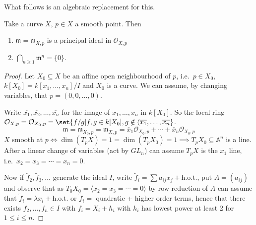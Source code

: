 \documentclass{article}
\newcommand{\A}{\mathbb{A}}
\begin{document}
What follows is an algebraic replacement for this.
\begin{thm}
    Take a curve $X$, $p \in X$ a smooth point. Then
    \begin{enumerate}[label=(\roman*)]
        \item $\mathfrak{m} = \mathfrak{m}_{X, p}$ is a principal ideal in $\mathcal{O}_{X, p}$
        \item $\bigcap_{n \geq 1} \mathfrak{m}^n = \{0\}$.
    \end{enumerate}
\end{thm}
\begin{proof}
    Let $X_0 \subseteq X$ be an affine open neighbourhood of $p$, i.e.\ $p \in X_0$, $k[X_0] = k[x_1, \dotsc, x_n] / I$ and $X_0$ is a curve.
    We can assume, by changing variables, that $p = (0, 0, \dotsc, 0)$.

    Write $\overline{x_1}, \overline{x_2}, \dotsc, \overline{x_n}$ for the image of $x_1, \dotsc, x_n$ in $k[X_0]$.
    So the local ring $\mathcal{O}_{X, p} = \mathcal{O}_{X_0, p} = \set{f / g | f, g \in k[X_0], g \notin \langle \overline{x_1}, \dotsc, \overline{x_n}}$.
    \begin{equation*}
        \mathfrak{m} = \mathfrak{m}_{X_0, p} = \mathfrak{m}_{X, p} = \overline{x}_1 \mathcal{O}_{X_0, p} + \dotsb + \overline{x}_n \mathcal{O}_{X_0, p}
    \end{equation*}
    $X$ smooth at $p \iff \dim(T_p X) = 1 = \dim(T_p X_0) = 1 \implies T_p X_0 \subseteq \A^n$ is a line.
    After a linear change of variables (act by $GL_n$) can assume $T_p X$ is the $x_1$ line, i.e.\ $x_2 = x_3 = \dotsb = x_n = 0$.

    Now if $\tilde{f}_2, \tilde{f}_3, \dotsc$ generate the ideal $I$, write $\tilde{f}_i = \sum a_{i j} x_j + \text{h.o.t.}$, put $A = (a_{ij})$
    and observe that as $T_0 X_0 = \langle x_2 = x_3 = \dotsb = 0 \rangle$ by row reduction of $A$ can assume that $\tilde{f}_i = \lambda x_i + \text{h.o.t.}$ or $\tilde{f}_i = $ quadratic + higher order terms, hence that there exists $f_2, \dotsc, f_n \in I$ with $f_i = X_i + h_i$ with $h_i$ has lowest power at least 2 for $1 \leq i \leq n$.
\end{proof}
\end{document}
